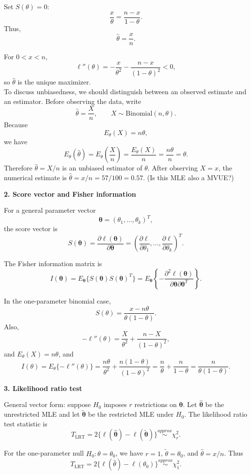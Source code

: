 \documentclass[12pt]{article}
\begin{document}
Set $S(\theta)=0$:
\[
\frac{x}{\theta}=\frac{n-x}{1-\theta}.
\]
Thus,
\[
\hat\theta=\frac{x}{n}.
\]

For $0<x<n$,
\[
\ell''(\theta)=-\frac{x}{\theta^2}-\frac{n-x}{(1-\theta)^2}<0,
\]
so $\hat \theta$ is the unique maximizer.\\

To discuss unbiasedness, we should distinguish between an observed estimate and an estimator. Before observing the data, write
\[
\hat\theta=\frac{X}{n},
\qquad X\sim \mathrm{Binomial}(n,\theta).
\]
Because
\[
E_\theta(X)=n\theta,
\]
we have
\[
E_\theta(\hat\theta)
=E_\theta\left(\frac{X}{n}\right)
=\frac{E_\theta(X)}{n}
=\frac{n\theta}{n}
=\theta.
\]
Therefore $\hat\theta=X/n$ is an unbiased estimator of $\theta$. After observing $X=x$, the numerical estimate is $\hat\theta=x/n=57/100=0.57$. (Is this MLE also a MVUE?)


{\bf 2. Score vector and Fisher information}

For a general parameter vector
\[
\boldsymbol\theta=(\theta_1,\ldots,\theta_k)^T,
\]
the score vector is
\[
S(\boldsymbol\theta)
=\frac{\partial \ell(\boldsymbol\theta)}{\partial \boldsymbol\theta}
=\left(
\frac{\partial \ell}{\partial \theta_1},\ldots,
\frac{\partial \ell}{\partial \theta_k}
\right)^T.
\]

The Fisher information matrix is
\[
I(\boldsymbol\theta)
=E_{\boldsymbol\theta}\{S(\boldsymbol\theta)S(\boldsymbol\theta)^T\}
=E_{\boldsymbol\theta}\left\{-\frac{\partial^2\ell(\boldsymbol\theta)}
{\partial \boldsymbol\theta\partial \boldsymbol\theta^T}\right\}.
\]

In the one-parameter binomial case,
\[
S(\theta)=\frac{x-n\theta}{\theta(1-\theta)}.
\]
Also,
\[
-\ell''(\theta)=\frac{X}{\theta^2}+\frac{n-X}{(1-\theta)^2}, 
\]
and $E_{\theta}(X)=n\theta$, and 
\[
I(\theta)
=E_\theta\{-\ell''(\theta)\}
=\frac{n\theta}{\theta^2}+\frac{n(1-\theta)}{(1-\theta)^2}
=\frac{n}{\theta}+\frac{n}{1-\theta}
=\frac{n}{\theta(1-\theta)}.
\]
\smallskip

{\bf 3. Likelihood ratio test}

General vector form: suppose $H_0$ imposes $r$ restrictions on $\boldsymbol\theta$. Let $\hat{\boldsymbol\theta}$ be the unrestricted MLE and let $\tilde{\boldsymbol\theta}$ be the restricted MLE under $H_0$. The likelihood ratio test statistic is
\[
T_{\mathrm{LRT}}
=2\{\ell(\hat{\boldsymbol\theta})-\ell(\tilde{\boldsymbol\theta})\}
\overset{approx}{\sim}\chi^2_r.
\]

For the one-parameter null $H_0:\theta=\theta_0$, we have $r=1$, $\tilde\theta=\theta_0$, and $\hat\theta=x/n$. Thus
\[
T_{\mathrm{LRT}}
=2\{\ell(\hat\theta)-\ell(\theta_0)\}
\overset{approx}{\sim}\chi^2_1.
\]
\end{document}
